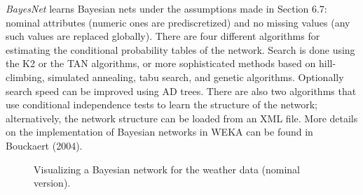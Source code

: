 \textit{BayesNet} learns Bayesian nets under the assumptions made in
Section 6.7: nominal attributes (numeric ones are prediscretized) and
no missing values (any such values are replaced globally). There are
four different algorithms for estimating the conditional probability
tables of the network. Search is done using the K2 or the TAN
algorithms, or more sophisticated methods based on hill-climbing,
simulated annealing, tabu search, and genetic algorithms. Optionally
search speed can be improved using AD trees. There are also two
algorithms that use conditional independence tests to learn the
structure of the network; alternatively, the network structure can be
loaded from an XML file. More details on the implementation of
Bayesian networks in WEKA can be found in Bouckaert (2004).

\begin{figure}[!th]
\centering
{}
\qquad
{}
\newline
{}
\caption{\label{fig:weather}Visualizing a Bayesian network for the weather data (nominal version).}
\end{figure}

